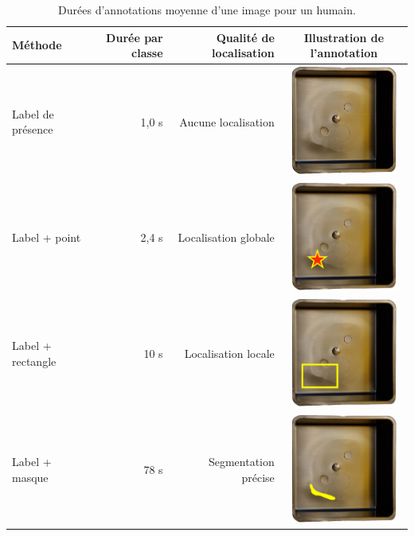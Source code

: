 \begin{table}[tbp]
	\centering
	\begin{tabular}{|l|r|r|c|}
		\arrayrulecolor{black}
		\hline
		Méthode & Durée par classe & Qualité de localisation & Illustration de l'annotation\\
		\hline
		\hline
		Label de présence & 1,0 s & Aucune localisation & \includegraphics[width=3.5cm,keepaspectratio,valign=c,margin=1mm 1mm]{../Chap3/Figures/163-35_r.jpeg}
		\\
		\hline
		Label + point & 2,4 s & Localisation globale & \includegraphics[width=3.5cm,keepaspectratio,valign=c,margin=1mm 1mm]{../Chap3/Figures/163-35_r_point.jpeg} \\
		\hline
		Label + rectangle & 10 s & Localisation locale & \includegraphics[width=3.5cm,keepaspectratio,valign=c,margin=1mm 1mm]{../Chap3/Figures/163-35_r_box.jpeg} \\
		\hline
		Label + masque & 78 s & Segmentation précise & \includegraphics[width=3.5cm,keepaspectratio,valign=c,margin=1mm 1mm]{../Chap3/Figures/163-35_r_segm.jpeg} \\
		\hline
	\end{tabular}
	\caption{Durées d'annotations moyenne d'une image pour un humain.}
	\label{tab:annotation}
\end{table}

